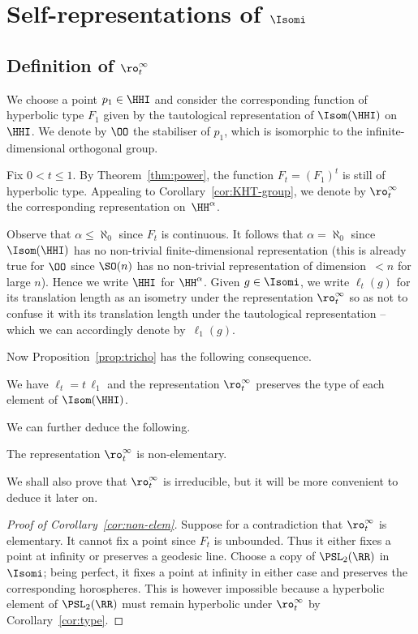 \section{Self-representations of \texorpdfstring{$\Isomi$}{Is(H)}}

\subsection{Definition of \texorpdfstring{$\ro^\infty_t$}{}}\label{defrot}

We choose a point $p_1\in\HHI$ and consider the corresponding function of hyperbolic type $F_1$ given by the tautological representation of $\Isom(\HHI)$ on $\HHI$. We denote by $\OO$ the stabiliser of $p_1$, which is isomorphic to the infinite-dimensional orthogonal group.

Fix $0<t\leq 1$. By Theorem~\ref{thm:power}, the function $F_t=(F_1)^t$ is still of hyperbolic type. Appealing to Corollary~\ref{cor:KHT-group}, we denote by $\ro^\infty_t$ the corresponding representation on~$\HH^\alpha$.

Observe that $\alpha\leq\aleph_0$ since $F_t$ is continuous. It follows that $\alpha=\aleph_0$ since $\Isom(\HHI)$ has no non-trivial finite-dimensional representation (this is already true for $\OO$ since $\SO(n)$ has no non-trivial representation of dimension~$<n$ for large $n$). Hence we write $\HHI$ for $\HH^\alpha$. Given $g\in\Isomi$, we write $\ell_t(g)$ for its translation length as an isometry under the representation $\ro^\infty_t$ so as not to confuse it with its translation length under the tautological representation -- which we can accordingly denote by~$\ell_1(g)$.

Now Proposition~\ref{prop:tricho} has the following consequence.

\begin{coro}\label{cor:type}
We have $\ell_t = t\, \ell_1$ and the representation $\ro^\infty_t$ preserves the type of each element of $\Isom(\HHI)$.
\end{coro}

We can further deduce the following.

\begin{coro}\label{cor:non-elem}
The representation $\ro^\infty_t$ is non-elementary.
\end{coro}

We shall also prove that $\ro^\infty_t$ is irreducible, but it will be more convenient to deduce it later on.

\begin{proof}[Proof of Corollary~\ref{cor:non-elem}]
Suppose for a contradiction that $\ro^\infty_t$ is elementary. It cannot fix a point since $F_t$ is unbounded. Thus it either fixes a point at infinity or preserves a geodesic line. Choose a copy of $\PSL_2(\RR)$ in $\Isomi$; being perfect, it fixes a point at infinity in either case and preserves the corresponding horospheres. This is however impossible because a hyperbolic element of $\PSL_2(\RR)$ must remain hyperbolic under $\ro^\infty_t$ by Corollary~\ref{cor:type}.
\end{proof}

